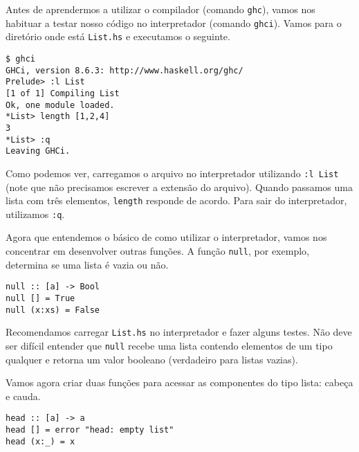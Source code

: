 \documentclass[a4paper]{article}
\begin{document}
Antes de aprendermos a utilizar o compilador (comando \texttt{ghc}), vamos nos habituar a testar nosso código no interpretador (comando \texttt{ghci}).
Vamos para o diretório onde está \texttt{List.hs} e executamos o seguinte.

\pagebreak

\begin{verbatim}
$ ghci                                                                      
GHCi, version 8.6.3: http://www.haskell.org/ghc/                                        
Prelude> :l List                                                                                   
[1 of 1] Compiling List                                                    
Ok, one module loaded.                                                                             
*List> length [1,2,4]                                                                              
3                                                                                                  
*List> :q                                                                                          
Leaving GHCi.               
\end{verbatim}

Como podemos ver, carregamos o arquivo no interpretador utilizando \texttt{:l List} (note que não precisamos escrever a extensão do arquivo).
Quando passamos uma lista com três elementos, \texttt{length} responde de acordo.
Para sair do interpretador, utilizamos \texttt{:q}.

Agora que entendemos o básico de como utilizar o interpretador, vamos nos concentrar em desenvolver outras funções.
A função \texttt{null}, por exemplo, determina se uma lista é vazia ou não.

\begin{verbatim}
null :: [a] -> Bool
null [] = True
null (x:xs) = False
\end{verbatim}

Recomendamos carregar \texttt{List.hs} no interpretador e fazer alguns testes.
Não deve ser difícil entender que \texttt{null} recebe uma lista contendo elementos de um tipo qualquer e retorna um valor booleano (verdadeiro para listas vazias).

Vamos agora criar duas funções para acessar as componentes do tipo lista: cabeça e cauda.

\begin{verbatim}
head :: [a] -> a
head [] = error "head: empty list"
head (x:_) = x
\end{verbatim}
\end{document}
